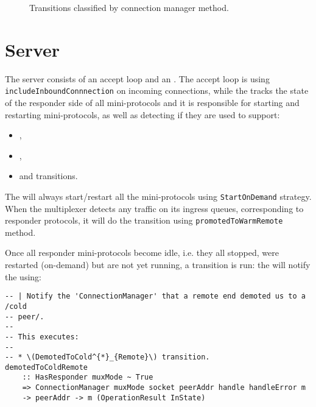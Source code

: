 \begin{figure}[p]
  \caption{Transitions classified by connection manager method.}
  \label{fig:methods}
\end{figure}

\section{Server}

The server consists of an accept loop and an \inbgov{}.  The
accept loop is using \texttt{includeInboundConnnection} on incoming
connections, while the \inbgov{} tracks the state of the responder side of all
mini-protocols and it is responsible for starting and restarting
mini-protocols, as well as detecting if they are used to support:

\begin{itemize}
  \item \PromotedToWarmDupRem{},
  \item \DemotedToColdUniRem{},
  \item \CommitUniRem{} and \CommitDupRem{} transitions.
\end{itemize}

The \inbgov{} will always start/restart all the mini-protocols using
\texttt{StartOnDemand} strategy.  When the multiplexer detects
any traffic on its ingress queues, corresponding to responder protocols,
it will do the \PromotedToWarmDupRem{} transition using
\texttt{promotedToWarmRemote} method.

Once all responder mini-protocols become idle, i.e. they all stopped, were
restarted (on-demand) but are not yet running, a \DemotedToColdAnyRem{}
transition is run: the \inbgov{} will notify the \connmngr{} using:

\begin{lstlisting}
-- | Notify the 'ConnectionManager' that a remote end demoted us to a /cold
-- peer/.
--
-- This executes:
--
-- * \(DemotedToCold^{*}_{Remote}\) transition.
demotedToColdRemote
    :: HasResponder muxMode ~ True
    => ConnectionManager muxMode socket peerAddr handle handleError m
    -> peerAddr -> m (OperationResult InState)
\end{lstlisting}

